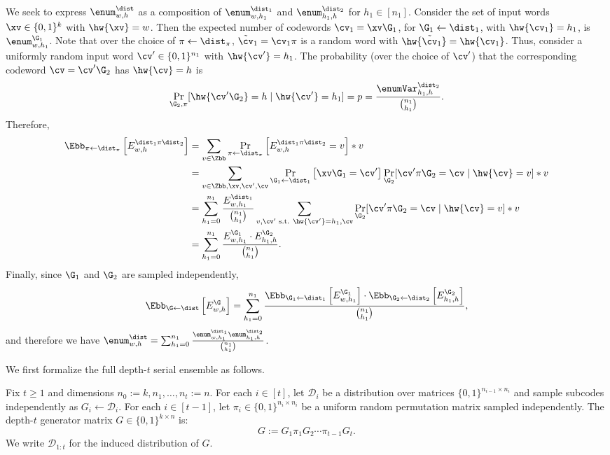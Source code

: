 We seek to express $\enum^{\dist}_{w,h}$ as a composition of $\enum^{\dist_1}_{w,h_1}$ and $\enum^{\dist_2}_{h_1,h}$ for $h_1\in [n_1]$.
Consider the set of input words $\xv \in \{0,1\}^k$ with $\hw{\xv} = w$. Then the expected number of codewords $\cv_1 = \xv\G_1$, for $\G_1\gets \dist_1$, with $\hw{\cv_1} = h_1$, is $\enum^{\G_1}_{w,h_1}$.
Note that over the choice of $\pi\gets\dist_\pi$, $\tilde{\cv}_1 = \cv_1\pi$ is a random word with $\hw{\tilde{\cv}_1} = \hw{\cv_1}$. Thus, consider a uniformly random input word ${\cv}' \in \{0,1\}^{n_1}$ with $\hw{{\cv}'} = h_1$. The probability (over the choice of ${\cv}'$) that the corresponding codeword $\cv = {\cv}'\G_2$ has $\hw{\cv} = h$ is
$$
   \Pr_{\G_2,\pi}[\hw{\cv'\G_2} = h \mid \hw{\cv'}=h_1 ]= p = \frac{\enumVar^{\dist_2}_{h_1,h}}{\binom{n_1}{h_1}}.
$$  
Therefore,
\begin{align*}
    \Ebb_{\pi \gets \dist_{\pi}}\left[E^{\dist_1 \pi \dist_2}_{w,h}\right] &=\sum_{v\in \Zbb} \Pr_{\pi \gets \dist_{\pi}}\left[E^{\dist_1 \pi \dist_2}_{w,h} = v\right] * v \\
    &=\sum_{v\in \Zbb,\xv,\cv',\cv}\Pr_{\G_1\gets\dist_1}\left[\xv \G_1 = \cv'\right] \Pr_{\G_2}[\cv'\pi\G_2 = \cv \mid \hw{\cv} = v] * v \\
    &=\sum_{h_1=0}^{n_1}
    \frac{E^{\dist_1}_{w,h_1} }{\binom{n_1}{h_1}}\sum_{v,\cv' \text{ s.t. } \hw{\cv'}=h_1, \cv}
    \Pr_{\G_2}[\cv'\pi\G_2 = \cv \mid \hw{\cv} = v] * v \\
    &=\sum_{h_1=0}^{n_1}\frac{E^{\G_1}_{w,h_1}\cdot E^{\G_2}_{h_1,h}}{\binom{n_1}{h_1}}.
\end{align*}
Finally, since $\G_1$ and $\G_2$ are sampled independently,
$$
    \Ebb_{\G \gets \dist}\left[E^{\G}_{w,h}\right] = \sum_{h_1=0}^{n_1}\frac{\Ebb_{\G_1 \gets \dist_1}\left[E^{\G_1}_{w,h_1}\right]\cdot \Ebb_{\G_2 \gets \dist_2}\left[E^{\G_2}_{h_1,h}\right]}{\binom{n_1}{h_1}},
$$ 
and therefore we have $\enum^\dist_{w,h}=\sum_{h_1=0}^{n_1}\frac{\enum^{\dist_1}_{w,h_1} \enum^{\dist_2}_{h_1,h}}{{n_1\choose h_1}}$. 

We first formalize the full depth-$t$ serial ensemble as follows.
\begin{definition}
Fix $t\ge 1$ and dimensions $n_0:=k, n_1,\ldots,n_t:=n$. For each $i\in[t]$, let $\mathcal{D}_i$ be a distribution over matrices $\{0,1\}^{n_{i-1}\times n_i}$ and sample subcodes independently as $G_i \gets \mathcal{D}_i$. For each $i\in[t-1]$, let $\pi_i \in \{0,1\}^{n_i\times n_i}$ be a uniform random permutation matrix sampled independently. The depth-$t$ generator matrix $G \in \{0,1\}^{k\times n}$ is:$$G := G_1\pi_1G_2\cdots\pi_{t-1}G_t.$$We write $\mathcal{D}_{1:t}$ for the induced distribution of $G$.
\end{definition}

